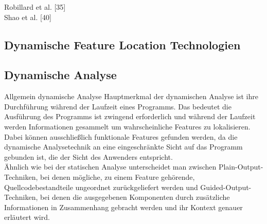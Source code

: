 \documentclass[runningheads,a4paper]{llncs}
\begin{document}
Robillard et al. [35]\\
Shao et al. [40]

\subsection{Dynamische Feature Location Technologien}


\subsection*{Dynamische Analyse}
Allgemein dynamische Analyse
Hauptmerkmal der dynamischen Analyse ist ihre Durchführung während der Laufzeit eines Programms. Das bedeutet die Ausführung des Programms ist zwingend erforderlich und während der Laufzeit werden Informationen gesammelt um wahrscheinliche Features zu lokalisieren. Dabei können ausschließlich funktionale Features gefunden werden, da die dynamische Analysetechnik an eine eingeschränkte Sicht auf das Programm gebunden ist, die der Sicht des Anwenders entspricht. \\Ähnlich wie bei der statischen Analyse unterscheidet man zwischen Plain-Output-Techniken, bei denen mögliche, zu einem Feature gehörende, Quellcodebestandteile ungeordnet zurückgeliefert werden und Guided-Output-Techniken, bei denen die ausgegebenen Komponenten durch zusätzliche Informationen in Zusammenhang gebracht werden und ihr Kontext genauer erläutert wird. 
\end{document}
